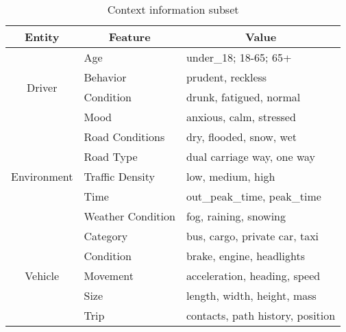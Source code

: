 \documentclass[conference]{IEEEtran}
\begin{document}
\begin{table}[ht]
\centering
\caption{Context information subset} \label{context}
\begin{tabular}{|c|l|l|}
\hline
Entity                       & \multicolumn{1}{c|}{Feature} & \multicolumn{1}{c|}{Value}          \\ \hline
\multirow{4}{*}{Driver}      & Age                          & under\_18; 18-65; 65+               \\ \cline{2-3} 
                             & Behavior                     & prudent, reckless                   \\ \cline{2-3} 
                             & Condition                    & drunk, fatigued, normal             \\ \cline{2-3} 
                             & Mood                         & anxious, calm, stressed             \\ \hline
\multirow{5}{*}{Environment} & Road Conditions              & dry, flooded, snow, wet             \\ \cline{2-3} 
                             & Road Type                    & dual carriage way, one way          \\ \cline{2-3} 
                             & Traffic Density              & low, medium, high                   \\ \cline{2-3} 
                             & Time                         & out\_peak\_time, peak\_time         \\ \cline{2-3} 
                             & Weather Condition            & fog, raining, snowing               \\ \hline
\multirow{5}{*}{Vehicle}     & Category                     & bus, cargo, private car, taxi       \\ \cline{2-3} 
                             & Condition                    & brake, engine, headlights \\ \cline{2-3} 
                             & Movement                     & acceleration, heading, speed        \\ \cline{2-3} 
                             & Size                         & length, width, height, mass         \\ \cline{2-3} 
                             & Trip                         & contacts, path history, position    \\ \hline
\end{tabular}
\end{table}
\end{document}
